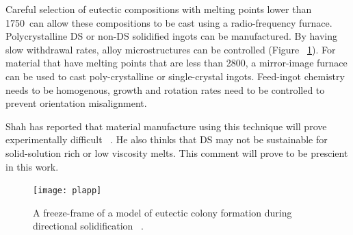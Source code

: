 Careful selection of eutectic compositions with melting points lower than 1750\celsius\ can allow these compositions to be cast using a radio-frequency furnace.  Polycrystalline DS or non-DS solidified ingots can be manufactured.  By having slow withdrawal rates, alloy microstructures can be controlled (Figure ~\ref{fig:plapp}).  For material that have melting points that are less than 2800\celsius, a mirror-image furnace can be used to cast poly-crystalline or single-crystal ingots.  Feed-ingot chemistry needs to be homogenous, growth and rotation rates need to be controlled to prevent orientation misalignment.

Shah has reported that material manufacture using this technique will prove experimentally difficult ~\cite{shah95}.  He also thinks that DS may not be sustainable for solid-solution rich or low viscosity melts.  This comment will prove to be prescient in this work.

%
\begin{figure}[H]
\begin{center}
\texttt{[image: plapp]}
\caption{ A freeze-frame of a model of eutectic colony formation during directional solidification ~\cite{plapp02}.}
\label{fig:plapp}
\end{center}
\end{figure}
%



